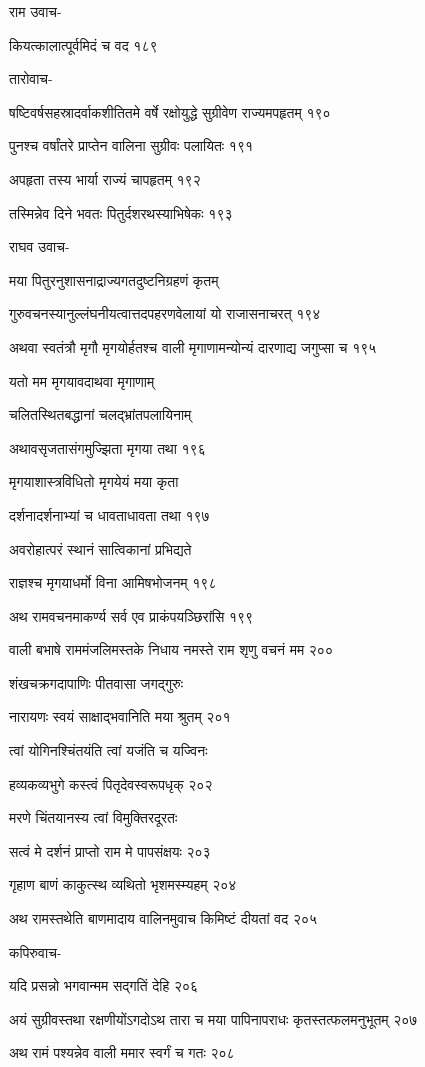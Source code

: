 राम उवाच-

कियत्कालात्पूर्वमिदं च वद १८९

तारोवाच-

षष्टिवर्षसहस्रादर्वाकशीतितमे वर्षे रक्षोयुद्धे सुग्रीवेण राज्यमपहृतम् १९०

पुनश्च वर्षांतरे प्राप्तेन वालिना सुग्रीवः पलायितः १९१

अपहृता तस्य भार्या राज्यं चापहृतम् १९२

तस्मिन्नेव दिने भवतः पितुर्दशरथस्याभिषेकः १९३

राघव उवाच-

मया पितुरनुशासनाद्राज्यगतदुष्टनिग्रहणं कृतम्

गुरुवचनस्यानुल्लंघनीयत्वात्तदपहरणवेलायां यो राजासनाचरत् १९४

अथवा स्वतंत्रौ मृगौ मृगयोर्हतश्च वाली मृगाणामन्योन्यं दारणाद्य जगुप्सा च १९५

यतो मम मृगयावदाथवा मृगाणाम्

चलितस्थितबद्धानां चलद्भ्रांतपलायिनाम्

अथावसृजतासंगमुज्झिता मृगया तथा १९६

मृगयाशास्त्रविधितो मृगयेयं मया कृता

दर्शनादर्शनाभ्यां च धावताधावता तथा १९७

अवरोहात्परं स्थानं सात्विकानां प्रभिद्यते

राज्ञश्च मृगयाधर्मो विना आमिषभोजनम् १९८

अथ रामवचनमाकर्ण्य सर्व एव प्राकंपयञ्छिरांसि १९९

वाली बभाषे राममंजलिमस्तके निधाय नमस्ते राम शृणु वचनं मम २००

शंखचक्रगदापाणिः पीतवासा जगद्गुरुः

नारायणः स्वयं साक्षाद्भवानिति मया श्रुतम् २०१

त्वां योगिनश्चिंतयंति त्वां यजंति च यज्विनः

हव्यकव्यभुगे कस्त्वं पितृदेवस्वरूपधृक् २०२

मरणे चिंतयानस्य त्वां विमुक्तिरदूरतः

सत्वं मे दर्शनं प्राप्तो राम मे पापसंक्षयः २०३

गृहाण बाणं काकुत्स्थ व्यथितो भृशमस्म्यहम् २०४

अथ रामस्तथेति बाणमादाय वालिनमुवाच किमिष्टं दीयतां वद २०५

कपिरुवाच-

यदि प्रसन्नो भगवान्मम सद्गतिं देहि २०६

अयं सुग्रीवस्तथा रक्षणीयोंऽगदोऽथ तारा च मया पापिनापराधः कृतस्तत्फलमनुभूतम् २०७

अथ रामं पश्यन्नेव वाली ममार स्वर्गं च गतः २०८

